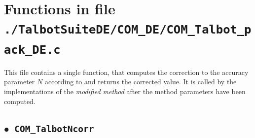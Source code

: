 \documentclass[a4paper,10pt]{report}%
\begin{document}
\section{Functions in file {\large\tt ./TalbotSuiteDE/COM\_DE/COM\_Talbot\_pack\_DE.c}}
This file contains a single function, that computes the correction to the accuracy parameter $N$ according to \cite{Talbot:1995} and returns the corrected value.
It is called by the implementations of the {\em modified method} after the method parameters have been computed.


\subsection{\texorpdfstring{$\boldsymbol{\bullet}$}{ - }{\tt\ COM\_TalbotNcorr}}
\end{document}
